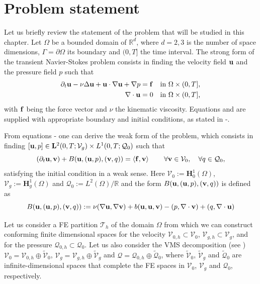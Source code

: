 \section{Problem statement}
\label{sec-C8_prob_statement}

Let us briefly review the statement of the problem that will be studied in this chapter. Let $\Omega$ be a bounded domain of $\mathbb{R}^d$, where $d=2,3$ is the number of space dimensions, $\Gamma=\partial\Omega$ its boundary and $(0,T]$ the time interval. The strong form of the transient Navier-Stokes problem consists in finding the velocity field ${\bf u}$ and the pressure field $p$ such that 
\begin{align}
\label{eq-C8_NS_strong_mome}
\partial_t{\bf u}-\nu\Delta{\bf u}+{\bf u}\cdot\nabla{\bf u}+\nabla p&={\bf f}&\mbox{in $\Omega\times(0,T]$,}\\
\label{eq-C8_NS_strong_inc}
\nabla\cdot{\bf u}&=0&\mbox{in $\Omega\times(0,T]$,}
\end{align}
with ${\bf f}$ being the force vector and $\nu$ the kinematic viscosity. Equations  and  are supplied with appropriate boundary and initial conditions, as stated in -.

From equations - one can derive the weak form of the problem, which consists in finding $[{\bf u},p]\in\mathbf{L}^2(0,T;\mathcal{V}_g)\times L^1(0,T;\mathcal{Q}_0)$ such that
\begin{equation}
\label{eq-C8_NS_weak}
(\partial_t{\bf u},{\bf v})+B({\bf u},({\bf u},p),({\bf v},q)) = \left<{\bf f},{\bf v}\right> 
\quad\quad\forall{\bf v}\in\mathcal{V}_0,\quad\forall q\in\mathcal{Q}_0,
\end{equation}
satisfying the initial condition  in a weak sense. Here $\mathcal{V}_0:=\mathbf{H}_0^1(\Omega)$, $\mathcal{V}_g:=\mathbf{H}_g^1(\Omega)$  and $\mathcal{Q}_0:=L^2(\Omega)/\mathbb{R}$ and the form $B({\bf u},({\bf u},p),({\bf v},q))$ is defined as 
\begin{equation}
\label{eq-C8_bilinear}
B({\bf u},({\bf u},p),({\bf v},q)):=\nu(\nabla{\bf u},\nabla{\bf v})+b({\bf u},{\bf u},{\bf v})-(p,\nabla\cdot{\bf v})+(q,\nabla\cdot{\bf u})
\end{equation}

Let us consider a FE partition $\mathcal{T}_h$ of the domain $\Omega$ from which we can construct conforming finite dimensional spaces for the velocity $\mathcal{V}_{0,h} \subset \mathcal{V}_0$, $\mathcal{V}_{g,h} \subset \mathcal{V}_g$, and for the pressure $\mathcal{Q}_{0,h}\subset \mathcal{Q}_0$. Let us also consider the VMS decomposition (see ) $\mathcal{V}_0=\mathcal{V}_{0,h}\oplus\widetilde{\mathcal{V}}_0$, $\mathcal{V}_g=\mathcal{V}_{g,h}\oplus\widetilde{\mathcal{V}}_g$ and $\mathcal{Q}=\mathcal{Q}_{0,h}\oplus\widetilde{\mathcal{Q}}_0$, where $\widetilde{\mathcal{V}}_0$, $\widetilde{\mathcal{V}}_g$ and $\widetilde{\mathcal{Q}}_0$ are infinite-dimensional spaces that complete the FE spaces in $\mathcal{V}_0$, $\mathcal{V}_g$ and $\mathcal{Q}_0$, respectively.

